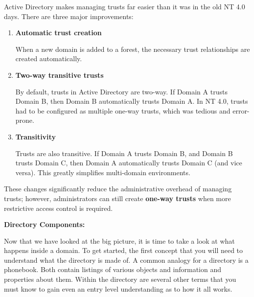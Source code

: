 Active Directory makes managing trusts far easier than it was in the old NT 4.0 days. There are three major improvements:

\begin{enumerate}
    \item \textbf{Automatic trust creation}

 When a new domain is added to a forest, the necessary trust relationships are created automatically.
    \item \textbf{Two-way transitive trusts}

 By default, trusts in Active Directory are two-way. If Domain A trusts Domain B, then Domain B automatically trusts Domain A. In NT 4.0, trusts had to be configured as multiple one-way trusts, which was tedious and error-prone.
    \item \textbf{Transitivity}

 Trusts are also transitive. If Domain A trusts Domain B, and Domain B trusts Domain C, then Domain A automatically trusts Domain C (and vice versa). This greatly simplifies multi-domain environments.
\end{enumerate}
These changes significantly reduce the administrative overhead of managing trusts; however, administrators can still create \textbf{one-way trusts} when more restrictive access control is required.

\textbf{Directory Components:}

Now that we have looked at the big picture, it is time to take a look at what happens inside a domain. To get started, the first concept that you will need to understand what the directory is made of. A common analogy for a directory is a phonebook. Both contain listings of various objects and information and properties about them. Within the directory are several other terms that you must know to gain even an entry level understanding as to how it all works.

